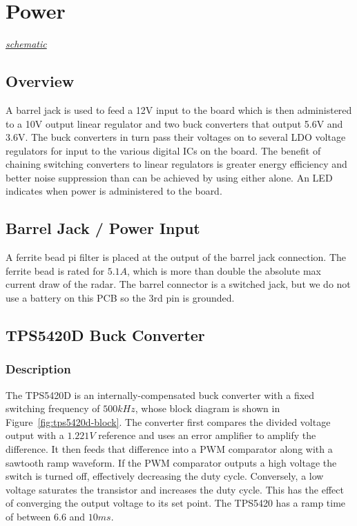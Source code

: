 \section{Power}
\label{sec:power}
\textit{\hyperlink{schematic.8}{schematic}}

\subsection{Overview}
\label{sec:power-overview}

A barrel jack is used to feed a 12V input to the board which is then administered to a 10V output
linear regulator and two buck converters that output 5.6V and 3.6V. The buck converters in turn pass
their voltages on to several LDO voltage regulators for input to the various digital ICs on the
board. The benefit of chaining switching converters to linear regulators is greater energy
efficiency and better noise suppression than can be achieved by using either alone. An LED indicates
when power is administered to the board.

\subsection{Barrel Jack / Power Input}
\label{sec:power-input}

A ferrite bead pi filter is placed at the output of the barrel jack connection. The ferrite bead is
rated for $5.1A$, which is more than double the absolute max current draw of the radar. The barrel
connector is a switched jack, but we do not use a battery on this PCB so the 3rd pin is grounded.

\subsection{TPS5420D Buck Converter}
\label{sec:tps5420d}

\subsubsection{Description}
\label{sec:tps5420d-description}

The TPS5420D is an internally-compensated buck converter with a fixed switching frequency of
$500\si{kHz}$, whose block diagram is shown in Figure~\ref{fig:tps5420d-block}. The converter first
compares the divided voltage output with a $1.221V$ reference and uses an error amplifier to amplify
the difference. It then feeds that difference into a PWM comparator along with a sawtooth ramp
waveform. If the PWM comparator outputs a high voltage the switch is turned off, effectively
decreasing the duty cycle. Conversely, a low voltage saturates the transistor and increases the duty
cycle. This has the effect of converging the output voltage to its set point. The TPS5420 has a ramp
time of between $6.6$ and $10 \si{ms}$.


